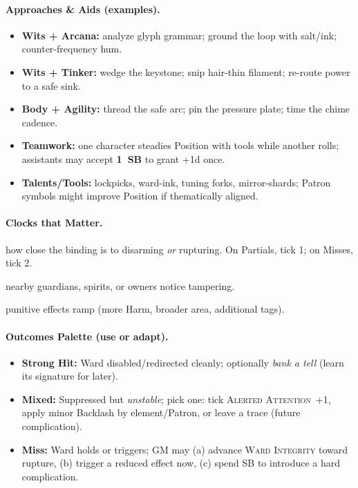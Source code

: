 \paragraph{Approaches & Aids (examples).}
\begin{itemize}
\item \textbf{Wits + Arcana:} analyze glyph grammar; ground the loop with salt/ink; counter-frequency hum.
\item \textbf{Wits + Tinker:} wedge the keystone; snip hair-thin filament; re-route power to a safe sink.
\item \textbf{Body + Agility:} thread the safe arc; pin the pressure plate; time the chime cadence.
\item \textbf{Teamwork:} one character steadies Position with tools while another rolls; assistants may accept \textbf{1~SB} to grant +1d once.
\item \textbf{Talents/Tools:} lockpicks, ward-ink, tuning forks, mirror-shards; Patron symbols might improve Position if thematically aligned.
\end{itemize}

\paragraph{Clocks that Matter.}
\begin{description}[leftmargin=1.6em]
\item[\textsc{Ward Integrity} (4):] how close the binding is to disarming \emph{or} rupturing. On Partials, tick 1; on Misses, tick 2.
\item[\textsc{Alerted Attention} (4):] nearby guardians, spirits, or owners notice tampering.
\item[\textsc{Escalation} (4/6):] punitive effects ramp (more Harm, broader area, additional tags).
\end{description}

\paragraph{Outcomes Palette (use or adapt).}
\begin{itemize}
\item \textbf{Strong Hit:} Ward disabled/redirected cleanly; optionally \emph{bank a tell} (learn its signature for later).
\item \textbf{Mixed:} Suppressed but \emph{unstable}; pick one: tick \textsc{Alerted Attention}~+1, apply minor Backlash by element/Patron, or leave a trace (future complication).
\item \textbf{Miss:} Ward holds or triggers; GM may (a) advance \textsc{Ward Integrity} toward rupture, (b) trigger a reduced effect now, (c) spend SB to introduce a hard complication.
\end{itemize}

